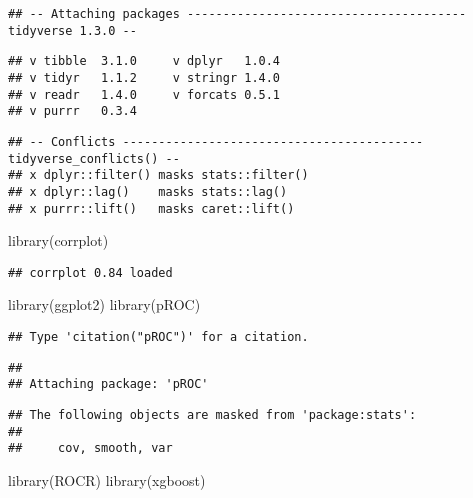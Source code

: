 \documentclass[
]{article}
\newenvironment{Shaded}{\begin{snugshade}}{\end{snugshade}}
\newcommand{\FunctionTok}[1]{\textcolor[rgb]{0.00,0.00,0.00}{#1}}
\newcommand{\NormalTok}[1]{#1}
\begin{document}
\begin{verbatim}
## -- Attaching packages --------------------------------------- tidyverse 1.3.0 --
\end{verbatim}

\begin{verbatim}
## v tibble  3.1.0     v dplyr   1.0.4
## v tidyr   1.1.2     v stringr 1.4.0
## v readr   1.4.0     v forcats 0.5.1
## v purrr   0.3.4
\end{verbatim}

\begin{verbatim}
## -- Conflicts ------------------------------------------ tidyverse_conflicts() --
## x dplyr::filter() masks stats::filter()
## x dplyr::lag()    masks stats::lag()
## x purrr::lift()   masks caret::lift()
\end{verbatim}

\begin{Shaded}
\begin{Highlighting}[]
\FunctionTok{library}\NormalTok{(corrplot)}
\end{Highlighting}
\end{Shaded}

\begin{verbatim}
## corrplot 0.84 loaded
\end{verbatim}

\begin{Shaded}
\begin{Highlighting}[]
\FunctionTok{library}\NormalTok{(ggplot2)}
\FunctionTok{library}\NormalTok{(pROC)}
\end{Highlighting}
\end{Shaded}

\begin{verbatim}
## Type 'citation("pROC")' for a citation.
\end{verbatim}

\begin{verbatim}
## 
## Attaching package: 'pROC'
\end{verbatim}

\begin{verbatim}
## The following objects are masked from 'package:stats':
## 
##     cov, smooth, var
\end{verbatim}

\begin{Shaded}
\begin{Highlighting}[]
\FunctionTok{library}\NormalTok{(ROCR)}
\FunctionTok{library}\NormalTok{(xgboost)}
\end{Highlighting}
\end{Shaded}
\end{document}
